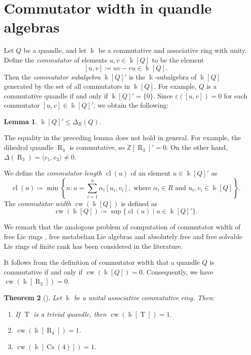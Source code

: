 \documentclass[12 pt]{amsart}
\newtheorem{theorem}{Theorem}[section]
\newtheorem{lemma}[theorem]{Lemma}
\theoremstyle{definition}
\theoremstyle{remark}
\numberwithin{equation}{section}
\newcommand{\cl}{\operatorname{cl}}
\newcommand{\Cs}{\operatorname{Cs}}
\newcommand{\cw}{\operatorname{cw}}
\newcommand{\T}{\operatorname{T}}
\newcommand{\R}{\operatorname{R}}
\renewcommand{\k}{\Bbbk}
\begin{document}

\section{Commutator width in quandle algebras}\label{commutator-width}
Let $Q$ be a quandle, and let $\k$ be a commutative and associative ring with unity. Define the \textit{commutator} of elements $u, v \in \k[Q]$ to be the element $$[u, v]\coloneq uv-vu\in\k[Q].$$ Then the \textit{commutator subalgebra} $\k[Q]'$ is the $\k$-subalgebra of $\k[Q]$ generated by the set of all commutators in $\k[Q]$. For example, $Q$ is a commutative quandle if and only if $\k[Q]' =\{0\}$. Since $\varepsilon([u, v])=0$ for each commutator $[u, v] \in \k[Q]'$, we obtain the following:

\begin{lemma}\label{commutator-augmentation}
$\k[Q]' \le \Delta_R(Q)$.
\end{lemma}

The equality in the preceding lemma does not hold in general. For example, the dihedral quandle $\R_3$ is commutative, so $\mathbb{Z}[\R_3]'=0$. On the other hand, $\Delta(\R_3) =\langle e_1,  e_2 \rangle \neq 0$. 

\par

We define the \textit{commutator length} $\cl(u)$ of an element $u \in \k[Q]'$ as 
$$\cl(u)\coloneq\min \left\{n: u= \sum_{i=1}^n \alpha_i [u_i,v_i], \textrm{ where }\alpha_i \in R\text{ and }u_i, v_i \in \k[Q]\right\}.$$
The \textit{commutator width} $\cw(\k[Q])$ is defined as 
$$\cw(\k[Q])\coloneq\sup \{\cl(u) \mid u \in \k[Q]'\}.$$

 We remark that the analogous problem of computation of  commutator width of free Lie rings \cite{Bardakov}, free metabelian Lie algebras \cite{Poroshenko} and absolutely free and free solvable Lie rings of finite rank \cite{Roman'kov} has been considered in the literature.
\par

It follows from the definition of commutator width that a quandle $Q$ is commutative if and only if  $\cw(\k[Q])=0$. Consequently, we have $\cw(\k[\R_3])=0$.
\par

\begin{theorem}[{\cite[Thm.\ 7.4]{BPS-1}}] Let $\k$ be a unital associative commutative ring. Then:
\begin{enumerate}
\item If $\T$ is a trivial quandle, then $\cw(\k[\T])=1$.
\item $\cw(\k[\R_4]) =1$.
\item $\cw(\k[\Cs(4)])=1$.
\end{enumerate}
\end{theorem}
\end{document}
